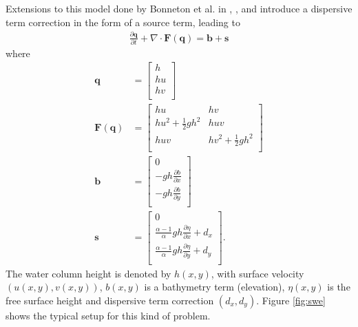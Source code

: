 Extensions to this model done by Bonneton et al. in \cite{bonneton2011splitting}, \cite{lannes2009derivation}, and \cite{lannes2015new} introduce a dispersive term correction in the form of a source term, leading to
\begin{align}
    \frac{\partial \textbf{q}}{\partial t} + \nabla \cdot \textbf{F}(\textbf{q}) = \textbf{b} + \textbf{s}
\end{align}
where
\begin{align}
    \textbf{q} &=
    \begin{bmatrix}
        h \\
        h u \\
        h v \\
    \end{bmatrix} \\
    \textbf{F}(\textbf{q}) &=
    \begin{bmatrix}
        h u & h v \\
        h u^2 + \frac{1}{2} gh^2 & h u v \\
        h u v & h v^2 + \frac{1}{2} gh^2 \\
    \end{bmatrix} \\
    \textbf{b} &=
    \begin{bmatrix}
        0 \\
        -g h \frac{\partial b}{\partial x} \\
        -g h \frac{\partial b}{\partial y} \\
    \end{bmatrix} \\
    \textbf{s} &=
    \begin{bmatrix}
        0 \\
        \frac{\alpha - 1}{\alpha} g h \frac{\partial \eta}{\partial x} + d_x \\
        \frac{\alpha - 1}{\alpha} g h \frac{\partial \eta}{\partial y} + d_y \\
    \end{bmatrix}.
\end{align}
The water column height is denoted by $h(x,y)$, with surface velocity $(u(x,y), v(x,y))$, $b(x,y)$ is a bathymetry term (elevation), $\eta(x,y)$ is the free surface height and dispersive term correction $(d_x, d_y)$. Figure \ref{fig:swe} shows the typical setup for this kind of problem.

